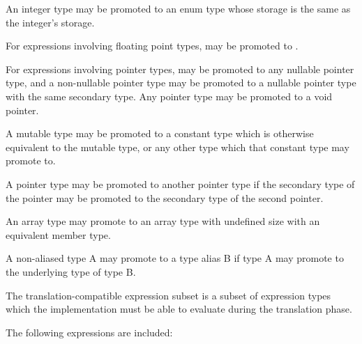 \specsubitem
An integer type may be promoted to an enum type whose storage is the
same as the integer's storage.

\specsubitem
For expressions involving floating point types,  may be promoted
to .

\specsubitem
For expressions involving pointer types,  may be promoted to any
nullable pointer type, and a non-nullable pointer type may be promoted to
a nullable pointer type with the same secondary type. Any pointer type may be
promoted to a void pointer.

\specsubitem
A mutable type may be promoted to a constant type which is otherwise equivalent
to the mutable type, or any other type which that constant type may promote to.

\specsubitem
A pointer type may be promoted to another pointer type if the secondary type of
the pointer may be promoted to the secondary type of the second pointer.

\specsubitem
An array type may promote to an array type with undefined size with an
equivalent member type.

\specsubitem
A non-aliased type A may promote to a type alias B if type A may promote to the
underlying type of type B.


The translation-compatible expression subset is a subset of expression types
which the implementation must be able to evaluate during the translation phase.

\specsubitem
The following expressions are included:

